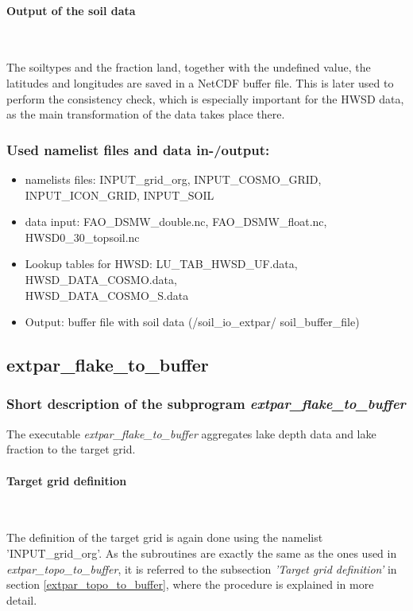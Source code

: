 \documentclass[a4paper,10pt,DIV14,BCOR1cm,titlepage,twoside]{scrartcl}
\begin{document}
\paragraph{Output of the soil data}\ \par\medskip\noindent
The soiltypes and the fraction land, together with the undefined value, the latitudes and longitudes are saved in a NetCDF buffer file. This is later used to perform the consistency check, which is especially important for the HWSD data, as the main transformation of the data takes place there. \par\medskip\noindent
\subsubsection{Used namelist files and data in-/output:}
\begin{itemize}
 \item namelists files: INPUT\_grid\_org, INPUT\_COSMO\_GRID, INPUT\_ICON\_GRID, INPUT\_SOIL
\item data input: FAO\_DSMW\_double.nc, FAO\_DSMW\_float.nc, \\
    HWSD0\_30\_topsoil.nc
\item Lookup tables for HWSD: LU\_TAB\_HWSD\_UF.data, HWSD\_DATA\_COSMO.data,\\ HWSD\_DATA\_COSMO\_S.data
\item Output: buffer file with soil data (/soil\_io\_extpar/ soil\_buffer\_file)
\end{itemize}
\subsection{extpar\_flake\_to\_buffer}\label{extpar_flake_to_buffer}
\subsubsection{Short description of the subprogram \textit{extpar\_flake\_to\_buffer}}
The executable \textit{extpar\_flake\_to\_buffer} aggregates lake depth data and lake fraction to the target grid.\par\medskip\noindent
\paragraph{Target grid definition} \ \par\medskip\noindent
The definition of the target grid is again done using the namelist 'INPUT\_grid\_org'. As the subroutines are exactly the same as the ones used in \textit{extpar\_topo\_to\_buffer}, it is referred to the subsection \textit{'Target grid definition'} in section \ref{extpar_topo_to_buffer}, where the procedure is explained in more detail. \par\medskip\noindent
\end{document}
